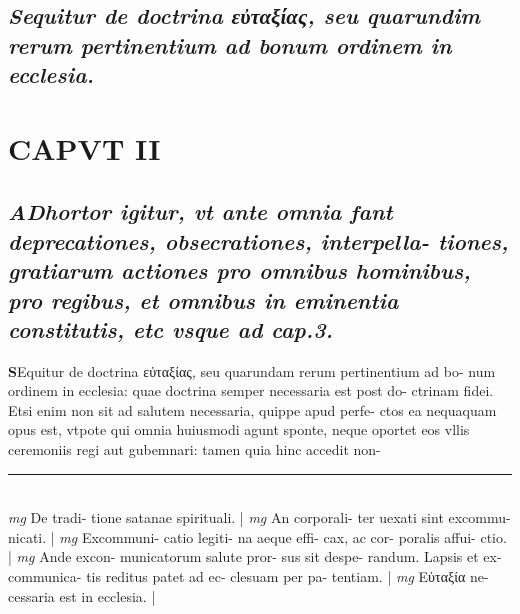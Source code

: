 \documentclass{article}
\begin{document}
\begin{pages}
{}
\subsection*{\textit{Sequitur de doctrina εὐταξίας, seu quarundim rerum pertinentium ad bonum ordinem in ecclesia. }}
\endnumbering\beginnumbering\section{CAPVT II}
{}
\subsection*{\textit{\huge\textbf{A}\normalsize Dhortor igitur, vt ante omnia fant deprecationes, obsecrationes, interpella- tiones, gratiarum actiones pro omnibus hominibus, pro regibus, et omnibus in eminentia constitutis, etc vsque  ad cap.3. }}\pstart \huge\textbf{S}\normalsize Equitur de doctrina εὐταξίας, seu quarundam rerum pertinentium ad bo- num ordinem in ecclesia: quae doctrina semper necessaria est post do- ctrinam fidei. Etsi enim non sit ad salutem necessaria, quippe apud perfe- ctos ea nequaquam opus est, vtpote qui omnia huiusmodi agunt sponte, neque oportet eos vllis ceremoniis regi aut gubemnari: tamen quia hinc accedit non-  \pend
\vspace{0.5cm}\noindent
\vspace{0.2cm}\rule{1cm}{0.2pt}\\ 
\hspace{0.2cm}\textit{mg}
\footnotesize De tradi- tione satanae spirituali. 
\normalsize| 
\hspace{0.2cm}\textit{mg}
\footnotesize An corporali- ter uexati sint excommu- nicati. 
\normalsize| 
\hspace{0.2cm}\textit{mg}
\footnotesize Excommuni- catio legiti- na aeque  effi- cax, ac cor- poralis affui- ctio. 
\normalsize| 
\hspace{0.2cm}\textit{mg}
\footnotesize Ande excon- municatorum salute pror- sus sit despe- randum. Lapsis et ex- communica- tis reditus patet ad ec- clesuam per pa- tentiam. 
\normalsize| 
\hspace{0.2cm}\textit{mg}
\footnotesize Εὐταξία ne- cessaria est in ecclesia. 
\normalsize| 

\end{pages}
\end{document}
